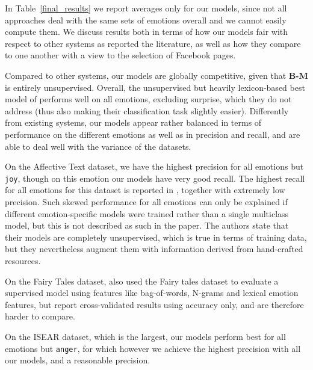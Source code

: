 \documentclass[11pt]{article}
\begin{document}
\bigskip

\noindent 
In Table~\ref{final_results} we report averages only for our models, since not all approaches deal with the same sets of emotions overall and we cannot easily compute them. 
We discuss results both in terms of how our models fair with respect to other systems as reported the literature, as well as how they compare to one another with a view to the selection of Facebook pages.


Compared to other systems, our models are globally competitive, given that \textbf{B-M} is entirely unsupervised. Overall, the unsupervised but heavily lexicon-based best model of \cite{kim2010evaluation} performs well on all emotions, excluding surprise, which they do not address (thus also making their classification task slightly easier). Differently from existing systems,  our models appear rather balanced in terms of performance on the different emotions as well as in precision and recall, and are able to deal well with the variance of the datasets. 

On the Affective Text dataset, we have the highest precision for all emotions but \texttt{joy}, though on this emotion our models have very good recall. The highest recall for all emotions for this dataset is reported in \cite{strapparava2008learning}, together with extremely low precision. Such skewed performance for all emotions can only be explained if different emotion-specific models were trained rather than a single multiclass model, but this is not described as such in the paper. The authors state that their models are completely unsupervised, which is true in terms of training data, but they nevertheless augment them with information derived from hand-crafted resources. 



On the Fairy Tales dataset, \cite{kim2010evaluation} 
 also used the Fairy tales dataset to evaluate a supervised model using features like bag-of-words, N-grams and lexical emotion features, but report cross-validated results using accuracy only, and are therefore harder to compare.

On the ISEAR dataset, which is the largest, our models perform best for all emotions but \texttt{anger}, for which however we achieve the highest precision with all our models, and a reasonable precision.
\end{document}
